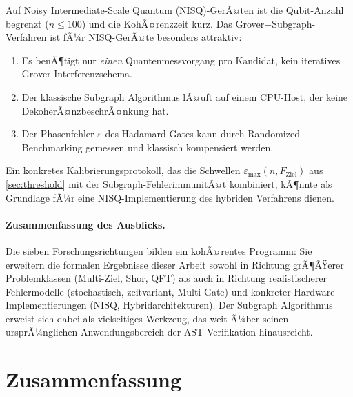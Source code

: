 ﻿\documentclass[11pt,a4paper]{article}
\theoremstyle{definition}
\begin{document}
Auf Noisy Intermediate-Scale Quantum (NISQ)-GerÃ¤ten \cite{Preskill2018} ist
die Qubit-Anzahl begrenzt ($n \leq 100$) und die KohÃ¤renzzeit kurz.
Das Grover+Subgraph-Verfahren ist fÃ¼r NISQ-GerÃ¤te besonders attraktiv:
\begin{enumerate}[label=(\alph*)]
  \item Es benÃ¶tigt nur \emph{einen} Quantenmessvorgang pro Kandidat,
        kein iteratives Grover-Interferenz\-schema.
  \item Der klassische Subgraph Algorithmus lÃ¤uft auf einem CPU-Host,
        der keine DekoherÃ¤nzbeschrÃ¤nkung hat.
  \item Der Phasenfehler $\varepsilon$ des Hadamard-Gates kann durch
        Randomized Benchmarking \cite{Magesan2011,Knill2008} gemessen und
        klassisch kompensiert werden.
\end{enumerate}
Ein konkretes Kalibrierungsprotokoll, das die Schwellen
$\varepsilon_{\max}(n, F_{\mathrm{Ziel}})$ aus \cref{sec:threshold} mit der
Subgraph-FehlerimmunitÃ¤t kombiniert, kÃ¶nnte als Grundlage fÃ¼r eine
NISQ-Implementierung des hybriden Verfahrens dienen.

\paragraph{Zusammenfassung des Ausblicks.}
Die sieben Forschungsrichtungen bilden ein kohÃ¤rentes Programm:
Sie erweitern die formalen Ergebnisse dieser Arbeit sowohl in Richtung
grÃ¶ÃŸerer Problemklassen (Multi-Ziel, Shor, QFT) als auch in Richtung
realistischerer Fehlermodelle (stochastisch, zeitvariant, Multi-Gate)
und konkreter Hardware-Implementierungen (NISQ, Hybridarchitekturen).
Der Subgraph Algorithmus \cite{Epp2026} erweist sich dabei als vielseitiges
Werkzeug, das weit Ã¼ber seinen ursprÃ¼nglichen Anwendungsbereich der
AST-Verifikation hinausreicht.


\section{Zusammenfassung}
\label{sec:conclusion}
\end{document}
